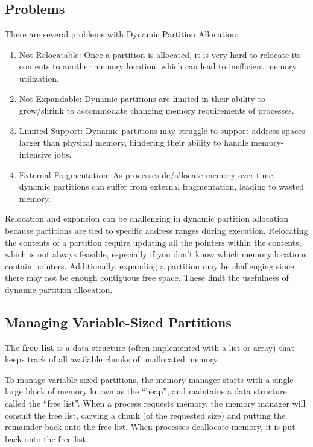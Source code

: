\documentclass{report}
\newcommand{\definitionBegin}[1]{\begin{tcolorbox}[title={Definition: #1}]}
\newcommand{\definitionEnd}{\end{tcolorbox}}
\begin{document}
\subsection{Problems}
\label{subsec:PROB2}
There are several problems with Dynamic Partition Allocation:
\begin{enumerate}[label=\textit{(\roman*)}]
\item Not Relocatable: Once a partition is allocated, it is very hard to relocate its contents to
  another memory location, which can lead to inefficient memory utilization.
\item Not Expandable: Dynamic partitions are limited in their ability to grow/shrink to
  accommodate changing memory requirements of processes.
\item Limited Support: Dynamic partitions may struggle to support address spaces larger than
  physical memory, hindering their ability to handle memory-intensive jobs.
\item External Fragmentation: As processes de/allocate memory over time, dynamic partitions can
  suffer from external fragmentation, leading to wasted memory.
\end{enumerate}
Relocation and expansion can be challenging in dynamic partition allocation because partitions
are tied to specific address ranges during execution. Relocating the contents of a partition require
updating all the pointers within the contents, which is not always feasible, especially if you don't
know which memory locations contain pointers. Additionally, expanding a partition may be challenging
since there may not be enough contiguous free space. These limit the usefulness of dynamic partition
allocation. 





\subsection{Managing Variable-Sized Partitions}
\label{subsec:FL}
\definitionBegin{Free List}
The \textbf{free list} is a data structure (often implemented with a list or array) that keeps track
of all available chunks of unallocated memory.
\definitionEnd

To manage variable-sized partitions, the memory manager starts with a single large block of memory
known as the ``heap'', and maintains a data structure called the ``free list''. When a process
requests memory, the memory manager will consult the free list, carving a chunk (of the requested
size) and putting the remainder back onto the free list. When processes deallocate memory, it is put
back onto the free list.
\end{document}
